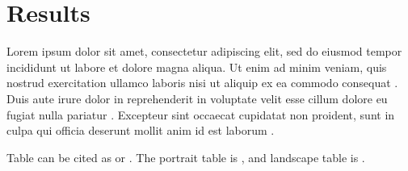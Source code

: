 \chapter{Results}
\label{chap:results}

Lorem ipsum dolor sit amet, consectetur adipiscing elit, sed do eiusmod tempor incididunt ut labore et dolore magna aliqua. Ut enim ad minim veniam, quis nostrud exercitation ullamco laboris nisi ut aliquip ex ea commodo consequat \textcite{ref1}. Duis aute irure dolor in reprehenderit in voluptate velit esse cillum dolore eu fugiat nulla pariatur \textcite{ref2}. Excepteur sint occaecat cupidatat non proident, sunt in culpa qui officia deserunt mollit anim id est laborum \textcite{ref3}.

Table can be cited as  or .
The portrait table is , and landscape table is .


